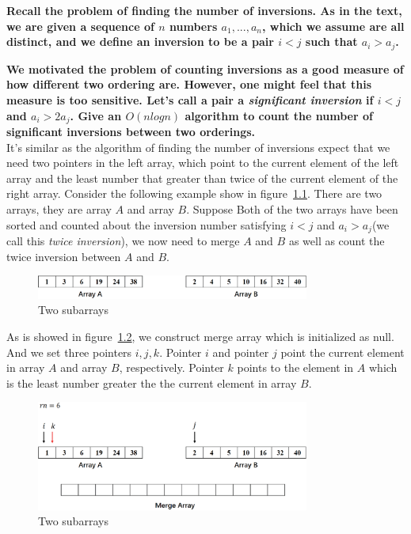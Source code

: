 
\chapter{}
\textbf{
Recall the problem of finding the number of inversions. As in the text, we are given a sequence of $n$ numbers $a_1,...,a_n$, which we assume are all distinct, and we define an inversion to be a pair $i<j$ such that $a_i>a_j$.
}

\textbf{
We motivated the problem of counting inversions as a good measure of how different two ordering are. However, one might feel that this measure is too sensitive. Let's call a pair a \emph{significant inversion} if $i<j$ and $a_i>2a_j$. Give an $O(n log n)$ algorithm to count the number of significant inversions between two orderings.
}
\hspace*{\fill} \\

It's similar as the algorithm of finding the number of inversions expect that we need two pointers in the left array, which point to the current element of the left array and the least number that greater than twice of the current element of the right array. Consider the following example show in figure~\ref{fig1}. There are two arrays, they are array $A$ and array $B$. Suppose Both of the two arrays have been sorted and counted about the inversion number satisfying $i<j$ and $a_i>a_j$(we call this \emph{twice inversion}), we now need to merge $A$ and $B$ as well as count the twice inversion between $A$ and $B$.
\\
\begin{figure}[!htbp]
\centering
\includegraphics[width=0.8\textwidth]{figures/1.eps}
\caption{Two subarrays}\label{fig1}
\end{figure}

As is showed in figure~\ref{fig2}, we construct merge array which is initialized as null. And we set three pointers $i,j,k$. Pointer $i$ and pointer $j$ point the current element in array $A$ and array $B$, respectively. Pointer $k$ points to the element in $A$ which is the least number greater the the current element in array $B$.
\\
\begin{figure}[!htbp]
\centering
\includegraphics[width=0.8\textwidth]{figures/2.eps}
\caption{Two subarrays}\label{fig2}
\end{figure}

